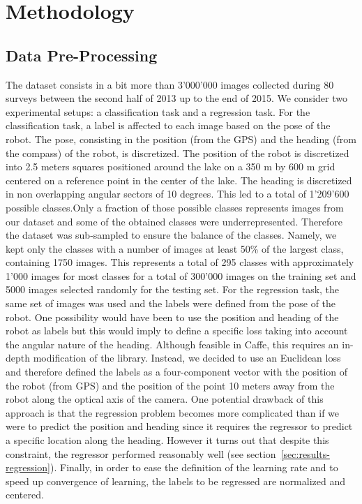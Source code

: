 \section{Methodology}

%

%

\subsection{Data Pre-Processing}


The dataset consists in a bit more than 3'000'000 images collected during 80 surveys between the second half of 2013 up to the end of 2015. We consider two experimental setups: a classification task and a regression task. For the classification task, a label is affected to each image based on the pose of the robot. The pose, consisting in the position (from the GPS) and the heading (from the compass) of the robot, is discretized. The position of the robot is discretized into 2.5 meters squares positioned around the lake on a 350 m by 600 m grid centered on a reference point in the center of the lake. The heading is discretized in non overlapping angular sectors of 10 degrees. This led to a total of 1'209'600 possible classes.Only a fraction of those possible classes represents images from our dataset and some of the obtained classes were underrepresented. Therefore the dataset was sub-sampled to ensure the balance of the classes. Namely, we kept only the classes with a number of images at least 50\% of the largest class, containing 1750 images. This represents a total of 295 classes with approximately 1'000 images for most classes for a total of 300'000 images on the training set  and 5000 images selected randomly for the testing set. For the regression task, the same set of images was used and the labels were defined from the pose of the robot. One possibility would have been to use the position and heading of the robot as labels but this would imply to define a specific loss taking into account the angular nature of the heading.
Although feasible in Caffe, this requires an in-depth modification of the library. Instead, we decided to use an Euclidean loss and therefore defined the labels as a four-component vector with the position of the robot (from GPS) and the position of the point 10 meters away from the robot along the optical axis of the camera. One potential drawback of this approach is that the regression problem becomes more complicated than if we were to predict the position and heading since it requires the regressor to predict a specific location along the heading. However it turns out that despite this constraint, the regressor performed reasonably well (see section~\ref{sec:results-regression}).
Finally, in order to ease the definition of the learning rate and to speed up convergence of learning, the labels to be regressed are normalized and centered.


